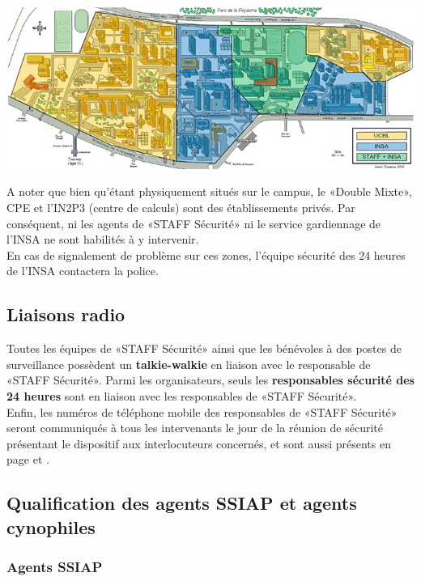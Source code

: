 \documentclass[hidelinks, paper=a4, fontsize=13pt]{report}
\begin{document}
\begin{center}
	\includegraphics[scale=0.8]{Annexes/Plans/perimetreSecu}
\end{center}


A noter que bien qu’étant physiquement situés sur le campus, le «Double Mixte», CPE et l’IN2P3 (centre de calculs) sont des établissements privés. Par conséquent, ni les agents de «STAFF Sécurité» ni le service gardiennage de l’INSA ne sont habilités à y intervenir. \\

En cas de signalement de  problème sur ces zones, l’équipe sécurité des 24 heures de l'INSA contactera la police.

\subsection{Liaisons radio}

Toutes les équipes de «STAFF Sécurité» ainsi que les bénévoles à des postes de surveillance possèdent un \textbf{talkie-walkie} en liaison avec le responsable de «STAFF Sécurité». Parmi les organisateurs, seuls les \textbf{responsables sécurité des 24 heures} sont en liaison avec les responsables de «STAFF Sécurité».\\

Enfin, les numéros de téléphone mobile des responsables de «STAFF Sécurité» seront communiqués à tous les intervenants le jour de la réunion de sécurité présentant le dispositif aux interlocuteurs concernés, et sont aussi présents en page \pageref{refTelPC} et \pageref{refTelOrgas}.

\subsection{Qualification des agents SSIAP et agents cynophiles}


\subsubsection{Agents SSIAP}
\end{document}
